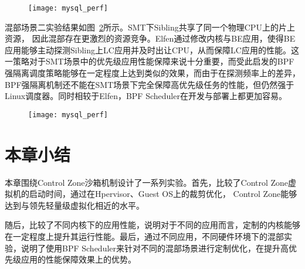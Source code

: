 \begin{figure}[!htbp]
    \centering
    \texttt{[image: mysql\_perf]}
    \label{fig:mysql_perf}
\end{figure}

混部场景二实验结果如图~\ref{fig:redis_smt}所示。SMT下Sibling共享了同一个物理CPU上的片上资源， 因此混部存在更激烈的资源竞争。Elfen\citep{yang2016elfen}通过修改内核与BE应用，使得BE应用能够主动探测Sibling上LC应用并及时出让CPU，从而保障LC应用的性能。这一策略对于SMT场景中的优先级应用性能保障来说十分重要，而受此启发的BPF强隔离调度策略能够在一定程度上达到类似的效果，而由于在探测频率上的差异，BPF强隔离机制还不能在SMT场景下完全保障高优先级任务的性能，但仍然强于Linux调度器。同时相较于Elfen，BPF Scheduler在开发与部署上都更加容易。

\begin{figure}[!htbp]
    \centering
    \texttt{[image: mysql\_perf]}
    \label{fig:redis_smt}
\end{figure}



\section{本章小结}

本章围绕Control Zone沙箱机制设计了一系列实验。首先，比较了Control Zone虚拟机的启动时间，通过在Hpervisor、Guest OS上的裁剪优化， Control Zone能够达到与领先轻量级虚拟化相近的水平。

随后，比较了不同内核下的应用性能，说明对于不同的应用而言，定制的内核能够在一定程度上提升其运行性能。最后，通过不同应用，不同硬件环境下的混部实验，说明了使用BPF Scheduler来针对不同的混部场景进行定制优化，在提升高优先级应用的性能保障效果上的优势。